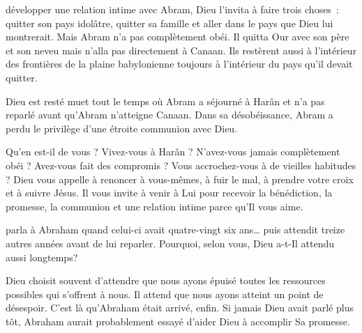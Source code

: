  développer une relation intime avec Abram,
 Dieu l'invita à faire trois choses~: quitter son pays idolâtre,
 quitter sa famille et aller dans le pays que Dieu lui montrerait.
 Mais Abram n'a pas complètement obéi.
 Il quitta Our avec son père et son neveu mais n'alla pas directement
 à Canaan.
 Ils restèrent aussi à l'intérieur des frontières de la plaine babylonienne
 \ocadr{}toujours à l'intérieur du pays qu'il devait quitter. 


Dieu est resté muet tout le temps où Abram a séjourné à Harân
 et n'a pas reparlé avant qu'Abram n'atteigne Canaan.
 Dans sa désobéissance, Abram a perdu le privilège d'une étroite
 communion avec Dieu. 

Qu'en est-il de vous ? Vivez-vous à Harân ?
 N'avez-vous jamais complètement obéi ? Avez-vous fait des compromis ?
 Vous accrochez-vous à de vieilles habitudes ?
 Dieu vous appelle à renoncer à vous-mêmes, à fuir le mal,
 à prendre votre croix et à suivre Jésus.
 Il vous invite à venir à Lui pour recevoir la bénédiction,
 la promesse, la communion et une relation intime
 \ocadr{}parce qu'Il vous aime. 

\dvrule






 parla à Abraham quand celui-ci avait quatre-vingt
 six ans\dots{} puis attendit treize autres années avant de lui reparler.
 Pourquoi, selon vous, Dieu a-t-Il attendu aussi longtemps? 

Dieu choisit souvent d'attendre que nous ayons épuisé toutes les ressources
 possibles qui s'offrent à nous.
 Il attend que nous ayons atteint un point de désespoir.
 C'est là qu'Abraham était arrivé, enfin.
 Si jamais Dieu avait parlé plus tôt, Abraham aurait probablement essayé
 d'aider Dieu à accomplir Sa promesse. 

